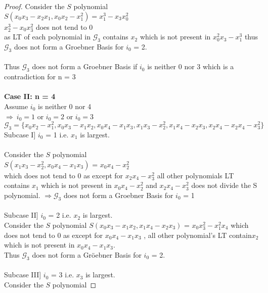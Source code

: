 \documentclass[12pt,a4paper]{article}
\theoremstyle{definition}
\begin{document}
\begin{proof}
Consider the $S$ polynomial\\
$S(x_{0}x_{3} - x_{2}x_{1} , x_{0}x_{2} - x_{1}^2) = x_{1}^3 - x_{3}x_{0}^2 $ \\
$x_{2}^3 - x_{0}x_{3}^2$ does not tend to 0  \\
as LT of each polynomial in $\mathcal{G}_3$ contains $x_{2}$
which is not present in $x_{0}^2x_{3} - x_{1}^3$ thus $\mathcal{G}_3$ does not form a Groebner Basis for $i_{0}$ = 2.\\
\\
Thus $\mathcal{G}_3$ does not form a Groebner Basis if $i_{0}$ is neither 0 nor 3 which is a contradiction for n = 3\\
\\
\noindent
{\bf Case II: n = 4}
\\Assume $i_{0}$ is neither 0 nor 4
\\$\Rightarrow\  i_{0}= 1$ or $i_{0} = 2$ or $i_{0} = 3$ \\
$\mathcal{G}_3 = \{x_{0}x_{2} - x_{1}^2 , x_{0}x_{3} - x_{1}x_{2}, x_{0}x_{4} - x_{1}x_{3} , x_{1}x_{3} - x_{2}^2 , x_{1}x_{4} - x_{2}x_{3} ,  x_{2}x_{4} - x_{2}x_{4} - x_{3}^2\}$
\\
Subcase I] $i_{0}$ = 1 i.e. $x_{1}$ is largest.
\\
\\
Consider the $S$ polynomial \\
$S(x_{1}x_{3} - x_{2}^2 , x_{0}x_{4} - x_{1}x_{3}) $ = $x_{0}x_{4} - x_{2}^2$\\
which does not tend to 0 as except for $x_{2}x_{4} - x_{3}^2 $ all other polynomials LT contains $x_{1}$ which is not present in $x_{0}x_{4} - x_{2}^2 $ and $x_{2}x_{4} - x_{3}^2$ does not divide the S polynomial.
$\Rightarrow \mathcal{G}_3$ does not form a Groebner Basis for $i_{0}$ = 1
\\
\\
Subcase II] $i_{0}$ = 2 i.e. $x_{2}$ is largest.
\\
Consider the $S$ polynomial
$S(x_{0}x_{3} - x_{1}x_{2} , x_{1}x_{4} - x_{2}x_{3})$ = $x_{0}x_{3}^2 - x_{1}^2x_{4}$
which does not tend to 0 
as except for $x_{0}x_{4} - x_{1}x_{3}$ , all other polynomial's LT contain$ x_{2}$ which is not present in $x_{0}x_{4} - x_{1}x_{3}$.\\
Thus $\mathcal{G}_3$ does not form a Gr\"{o}ebner Basis for $i_{0}$ = 2.
\\
\\
Subcase III] $i_{0}$ = 3 i.e. $x_{3}$ is largest.
 \\
 Consider the $S$ polynomial

\end{proof}
\end{document}
